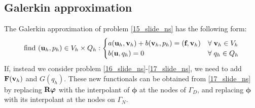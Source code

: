 \subsection{Galerkin approximation}
The Galerkin approximation of problem \eqref{15_slide_ns} has the following form: 
\begin{equation}
    \text{find }(\textbf{u}_h, p_h) \in V_h\times Q_h :
    \begin{cases}
        a(\textbf{u}_h,\textbf{v}_h) + b(\textbf{v}_h, p_h) =(\textbf{f}, \textbf{v}_h) & \forall \; \textbf{v}_h \in V_h \\
        b(\textbf{u}, q_h) = 0 & \forall \; q_h \in Q_h
    \end{cases}
    \label{18_slide_ns}
\end{equation}
If, instead we consider problem \eqref{16_slide_ns}-\eqref{17_slide_ns}, we need to add \(\textbf{F}(\textbf{v}_h)\) and \(G(q_h)\). These new functionals can be obtained from \eqref{17_slide_ns} by replacing \(\textbf{R}\bm{\varphi}\) with the interpolant of \(\bm{\phi}\) at the nodes of \(\Gamma_D\), and replacing \(\bm{\phi}\) with its interpolant at the nodes on \(\Gamma_N\).

